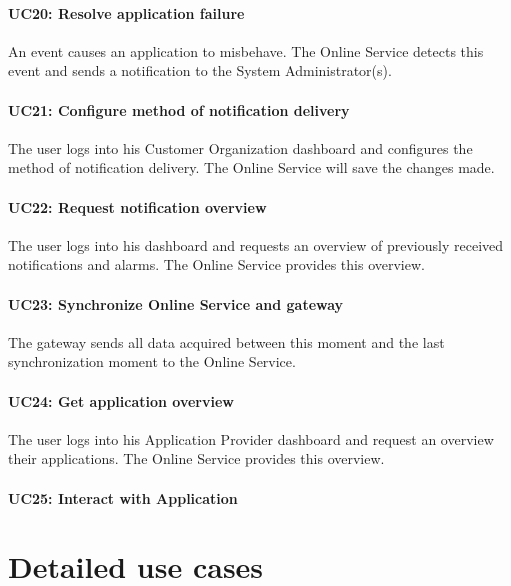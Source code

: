 \documentclass[english,peerreview]{sareport}
\begin{document}
\paragraph{UC20: Resolve application failure}
An event causes an application to misbehave. The Online Service detects this event and sends a notification to the System Administrator(s). 

\paragraph{UC21: Configure method of notification delivery}
The user logs into his Customer Organization dashboard and configures the method of notification delivery. The Online Service will save the changes made.

\paragraph{UC22: Request notification overview}
The user logs into his dashboard and requests an overview of previously received notifications and alarms. The Online Service provides this overview.

\paragraph{UC23: Synchronize Online Service and gateway}
The gateway sends all data acquired between this moment and the last synchronization moment to the Online Service.

\paragraph{UC24: Get application overview}
The user logs into his Application Provider dashboard and request an overview their applications. The Online Service provides this overview.

\paragraph{UC25: Interact with Application}
\todo

\newpage

\section{Detailed use cases}
\end{document}

